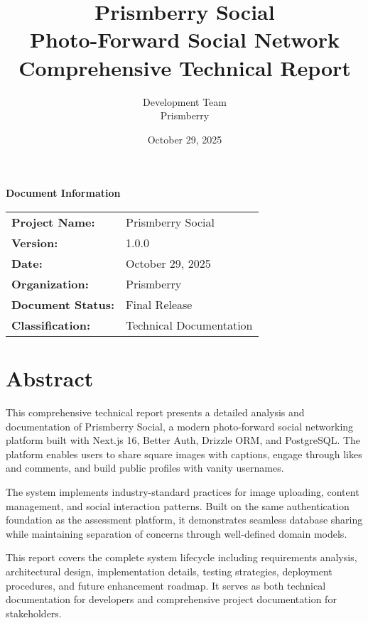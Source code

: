 \documentclass[12pt,a4paper]{report}
\title{
    \vspace{-2cm}
    \Huge\textbf{\color{primarycolor}Prismberry Social} \\
    \vspace{0.5cm}
    \Large Photo-Forward Social Network \\
    \vspace{0.3cm}
    \large Comprehensive Technical Report
}
\author{Development Team \\ Prismberry}
\date{October 29, 2025}
\begin{document}
\maketitle
\thispagestyle{empty}

\vfill
\begin{center}
\large
\textbf{Document Information}

\vspace{1cm}
\begin{tabular}{ll}
\textbf{Project Name:} & Prismberry Social \\
\textbf{Version:} & 1.0.0 \\
\textbf{Date:} & October 29, 2025 \\
\textbf{Organization:} & Prismberry \\
\textbf{Document Status:} & Final Release \\
\textbf{Classification:} & Technical Documentation \\
\end{tabular}
\end{center}
\vfill

\newpage

\chapter*{Abstract}

This comprehensive technical report presents a detailed analysis and documentation of Prismberry Social, a modern photo-forward social networking platform built with Next.js 16, Better Auth, Drizzle ORM, and PostgreSQL. The platform enables users to share square images with captions, engage through likes and comments, and build public profiles with vanity usernames.

The system implements industry-standard practices for image uploading, content management, and social interaction patterns. Built on the same authentication foundation as the assessment platform, it demonstrates seamless database sharing while maintaining separation of concerns through well-defined domain models.

This report covers the complete system lifecycle including requirements analysis, architectural design, implementation details, testing strategies, deployment procedures, and future enhancement roadmap. It serves as both technical documentation for developers and comprehensive project documentation for stakeholders.
\end{document}
